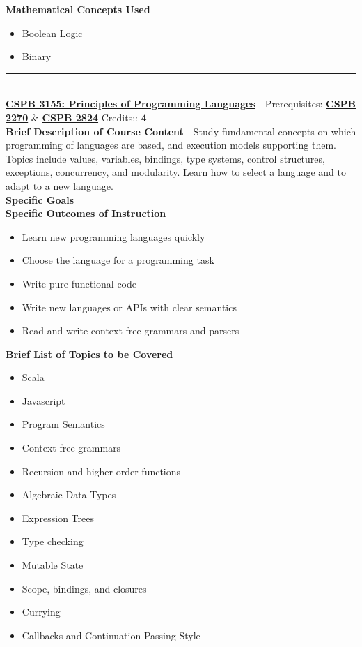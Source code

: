 \documentclass{article}
\newcommand{\horizontalline}{\noindent \rule{\textwidth}{0.5pt} \\}
\begin{document}
\noindent \textbf{Mathematical Concepts Used}
\begin{itemize}
    \item Boolean Logic
    \item Binary
\end{itemize}
\horizontalline
\noindent \href{https://www.colorado.edu/program/cspb/cspb-3155-principles-programming-languages}{\textbf{CSPB 3155: Principles of Programming Languages}} - Prerequisites: \href{https://www.colorado.edu/program/cspb/cspb-2270-computer-science-2-data-structures}{\textbf{CSPB 2270}} \& \href{https://www.colorado.edu/program/cspb/cspb-2824-discrete-structures}{\textbf{CSPB 2824}} Credits:: \textbf{4} \\

\noindent \textbf{Brief Description of Course Content} - Study fundamental concepts on which programming of languages are based, and execution models supporting them. Topics include values, variables, bindings, type systems, control structures, exceptions, concurrency, and modularity. Learn how to select a language and to adapt to a new language. \\

\noindent \textbf{Specific Goals} \\

\noindent \textbf{Specific Outcomes of Instruction}
\begin{itemize}
    \item Learn new programming languages quickly
    \item Choose the language for a programming task
    \item Write pure functional code
    \item Write new languages or APIs with clear semantics
    \item Read and write context-free grammars and parsers
\end{itemize}

\noindent \textbf{Brief List of Topics to be Covered}
\begin{itemize}
    \item Scala
    \item Javascript
    \item Program Semantics
    \item Context-free grammars
    \item Recursion and higher-order functions
    \item Algebraic Data Types
    \item Expression Trees
    \item Type checking
    \item Mutable State
    \item Scope, bindings, and closures
    \item Currying
    \item Callbacks and Continuation-Passing Style
\end{itemize}
\end{document}

